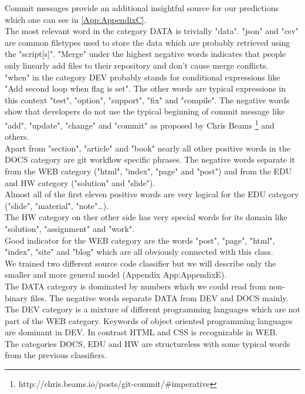 \documentclass[%
a4paper,
DIV12,
2.5headlines,
bigheadings,
titlepage,
openbib,
]{scrartcl}
\begin{document}
Commit messages provide an additional insightful source for our predictions which one can see in \ref{App:AppendixC}.\\
The most relevant word in the category DATA is trivially "data".
"json" and "csv" are common filetypes used to store the data which are probably retrieved using the "script[s]".
"Merge" under the highest negative words indicates that people only linearly add files to their repository and don't cause merge conflicts.\\
"when" in the category DEV probably stands for conditional expressions like "Add second loop when flag is set".
The other words are typical expressions in this context "test", "option", "support", "fix" and "compile".
The negative words show that developers do not use the typical beginning of commit message like "add", "update", "change" and "commit" as proposed by Chris Beams \footnote{http://chris.beams.io/posts/git-commit/\#imperative} and others.\\
Apart from "section", "article" and "book" nearly all other positive words in the DOCS category are git workflow specific phrases.
The negative words separate it from the WEB category ("html", "index", "page" and "post") and from the EDU and HW category ("solution" and "slide").\\
Almost all of the first eleven positive words are very logical for the EDU category ("slide", "material", "note"\dots).\\
The HW category on ther other side has very special words for its domain like "solution", "assignment" and "work".\\
Good indicator for the WEB category are the words "post", "page", "html", "index", "site" and "blog" which are all obviously connected with this class.\\

We trained two different source code classifier but we will describe only the smaller and more general model (Appendix App:AppendixE).\\
The DATA category is dominated by numbers which we could read from non-binary files.
The negative words separate DATA from DEV and DOCS mainly.\\
The DEV category is a mixture of different programming languages which are not part of the WEB category.
Keywords of object oriented programming languages are dominant in DEV.
In contrast HTML and CSS is recognizable in WEB.\\
The categories DOCS, EDU and HW are structureless with some typical words from the previous classifiers.
\end{document}
